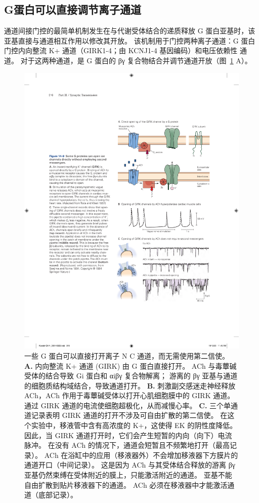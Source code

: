 \subsection{G蛋白可以直接调节离子通道}

通道间接门控的最简单机制发生在与代谢受体结合的递质释放 G 蛋白亚基时，该亚基直接与通道相互作用以修改其开放。
该机制用于门控两种离子通道：G 蛋白门控内向整流 K+ 通道（GIRK1-4；由 KCNJ1-4 基因编码）和电压依赖性  通道。
对于这两种通道，是 G 蛋白的 βγ 复合物结合并调节通道开放（图~\ref{fig:14_9} A）。


\begin{figure}[htbp]
	\centering
	\includegraphics[width=0.65\linewidth]{chap14/fig_14_9}
	\caption{一些 G 蛋白可以直接打开离子 N C 通道，而无需使用第二信使。
		\textbf{A.} 内向整流 K+ 通道 (GIRK) 由 G 蛋白直接打开。 ACh 与毒蕈碱受体的结合导致 Gi 蛋白和 αiβγ 复合物解离；
		游离的 βγ 亚基与通道的细胞质结构域结合，导致通道打开。
		\textbf{B.} 刺激副交感迷走神经释放 ACh，ACh 作用于毒蕈碱受体以打开心肌细胞膜中的 GIRK 通道。
		通过 GIRK 通道的电流使细胞超极化，从而减慢心率\cite{toda1967interactions}。
		\textbf{C.} 三个单通道记录表明 GIRK 通道的打开不涉及可自由扩散的第二信使。
		在这个实验中，移液管中含有高浓度的 K+，这使得 EK 的阴性度降低。
		因此，当 GIRK 通道打开时，它们会产生短暂的内向（向下）电流脉冲。
		在没有 ACh 的情况下，通道会短暂且不频繁地打开（最高记录）。
		ACh 在浴缸中的应用（移液器外）不会增加移液器下方膜片的通道开口（中间记录）。
		这是因为 ACh 与其受体结合释放的游离 βγ 亚基仍然束缚在受体附近的膜上，只能激活附近的通道。
		亚基不能自由扩散到贴片移液器下的通道。 ACh 必须在移液器中才能激活通道（底部记录）\cite{soejima1984mode}。}
	\label{fig:14_9}
\end{figure}


